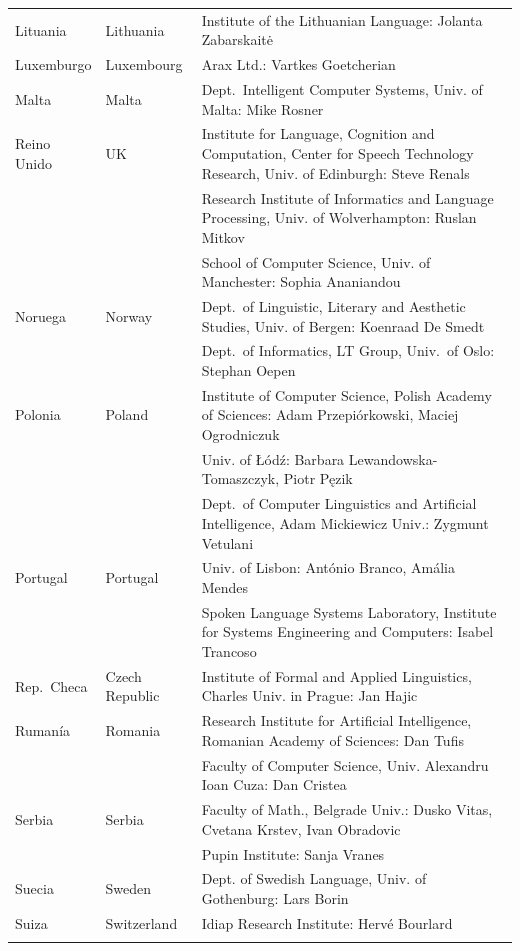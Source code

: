 \begin{longtable}{@{}llp{113mm}@{}}
  Lituania & \textcolor{grey1}{Lithuania} & Institute of the Lithuanian Language: Jolanta Zabarskaitė \\ \addlinespace
  Luxemburgo & \textcolor{grey1}{Luxembourg} & Arax Ltd.: Vartkes Goetcherian \\ \addlinespace
  Malta & \textcolor{grey1}{Malta} & Dept.~Intelligent Computer Systems, Univ. of Malta: Mike Rosner \\ \addlinespace Reino Unido & \textcolor{grey1}{UK} & Institute for Language, Cognition and Computation, Center for Speech Technology Research, Univ. of Edinburgh: Steve Renals \\ \addlinespace 
  & & Research Institute of Informatics and Language Processing, Univ. of Wolverhampton: Ruslan Mitkov \\ \addlinespace 
  & & School of Computer Science, Univ. of Manchester: Sophia Ananiandou \\ \addlinespace 
  Noruega & \textcolor{grey1}{Norway} & Dept.~of Linguistic, Literary and Aesthetic Studies, Univ. of Bergen: Koenraad De Smedt \\ \addlinespace 
  & & Dept.~of Informatics, LT Group, Univ.~of Oslo: Stephan Oepen \\ \addlinespace
  Polonia & \textcolor{grey1}{Poland} & Institute of Computer Science, Polish Academy of Sciences: Adam Przepiórkowski, Maciej Ogrodniczuk \\ \addlinespace
  & & Univ. of Łódź: Barbara Lewandowska-Tomaszczyk, Piotr Pęzik \\ \addlinespace
  & & Dept.~of Computer Linguistics and Artificial Intelligence, Adam Mickiewicz Univ.: Zygmunt Vetulani \\ \addlinespace
  Portugal & \textcolor{grey1}{Portugal} & Univ. of Lisbon: António Branco, Amália Mendes \\ \addlinespace
  & & Spoken Language Systems Laboratory, Institute for Systems Engineering and Computers: Isabel Trancoso \\ \addlinespace
  Rep.~Checa & \textcolor{grey1}{Czech Republic} & Institute of Formal and Applied Linguistics, Charles Univ. in Prague: Jan Hajic \\ \addlinespace
  Rumanía & \textcolor{grey1}{Romania} & Research Institute for Artificial Intelligence, Romanian Academy of Sciences: Dan Tufis \\ \addlinespace
  & & Faculty of Computer Science, Univ. Alexandru Ioan Cuza: Dan Cristea \\ \addlinespace
  Serbia & \textcolor{grey1}{Serbia} & Faculty of Math., Belgrade Univ.: Dusko Vitas, Cvetana Krstev, Ivan Obradovic \\ \addlinespace
  & & Pupin Institute: Sanja Vranes \\ \addlinespace  
  Suecia & \textcolor{grey1}{Sweden} & Dept. of Swedish Language, Univ. of Gothenburg: Lars Borin \\ \addlinespace 
  Suiza & \textcolor{grey1}{Switzerland} & Idiap Research Institute: Hervé Bourlard \\ \addlinespace 
\end{longtable}
\normalsize

